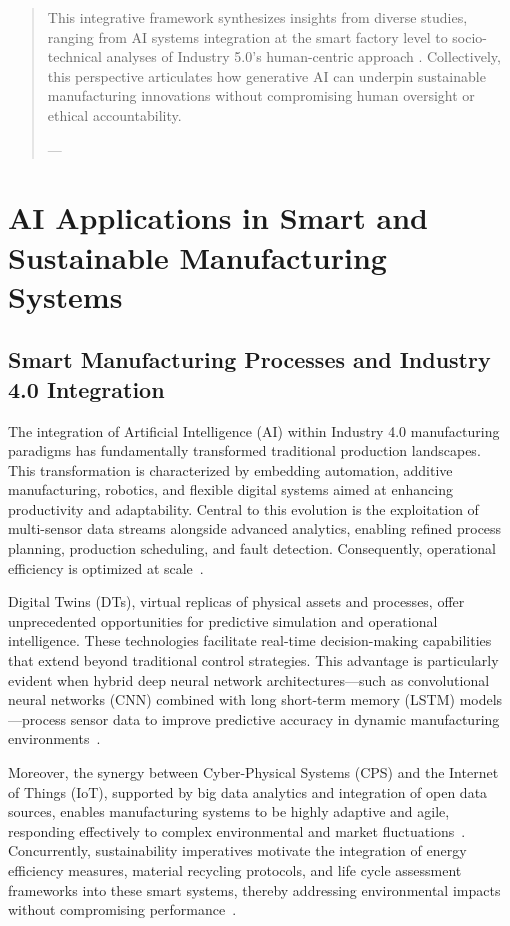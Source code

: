 \documentclass[sigconf]{acmart}
\begin{document}
\begin{abstract}
This integrative framework synthesizes insights from diverse studies, ranging from AI systems integration at the smart factory level \cite{ref11} to socio-technical analyses of Industry 5.0’s human-centric approach \cite{ref19}. Collectively, this perspective articulates how generative AI can underpin sustainable manufacturing innovations without compromising human oversight or ethical accountability.

---
\end{abstract}

\maketitle

\section{AI Applications in Smart and Sustainable Manufacturing Systems}

\subsection{Smart Manufacturing Processes and Industry 4.0 Integration}

The integration of Artificial Intelligence (AI) within Industry 4.0 manufacturing paradigms has fundamentally transformed traditional production landscapes. This transformation is characterized by embedding automation, additive manufacturing, robotics, and flexible digital systems aimed at enhancing productivity and adaptability. Central to this evolution is the exploitation of multi-sensor data streams alongside advanced analytics, enabling refined process planning, production scheduling, and fault detection. Consequently, operational efficiency is optimized at scale~\cite{ref6,ref7}.  

Digital Twins (DTs), virtual replicas of physical assets and processes, offer unprecedented opportunities for predictive simulation and operational intelligence. These technologies facilitate real-time decision-making capabilities that extend beyond traditional control strategies. This advantage is particularly evident when hybrid deep neural network architectures—such as convolutional neural networks (CNN) combined with long short-term memory (LSTM) models—process sensor data to improve predictive accuracy in dynamic manufacturing environments~\cite{ref31,ref33,ref35}.  

Moreover, the synergy between Cyber-Physical Systems (CPS) and the Internet of Things (IoT), supported by big data analytics and integration of open data sources, enables manufacturing systems to be highly adaptive and agile, responding effectively to complex environmental and market fluctuations~\cite{ref9,ref20,ref22}. Concurrently, sustainability imperatives motivate the integration of energy efficiency measures, material recycling protocols, and life cycle assessment frameworks into these smart systems, thereby addressing environmental impacts without compromising performance~\cite{ref38,ref41}.  
\end{document}
